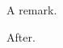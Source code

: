 \documentclass{article}
\begin{document}
\begin{remark} A remark. \end{remark}
After.
\end{document}
